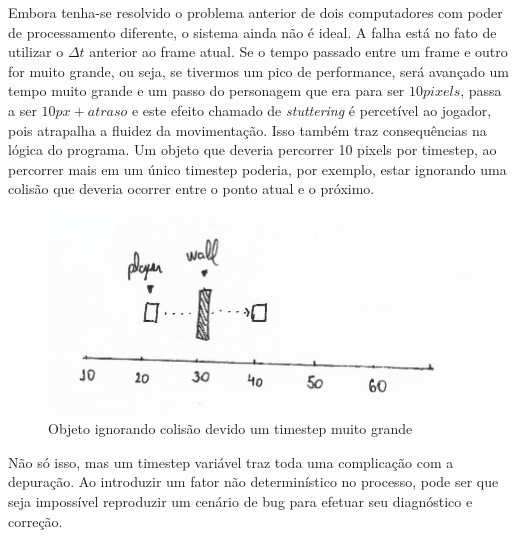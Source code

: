 \documentclass[12pt, 
openright, 
oneside, 
a4paper,    
brazil]{facom-ufu-abntex2}
\begin{document}
Embora tenha-se resolvido o problema anterior de dois computadores com poder de processamento diferente, o sistema ainda não é ideal. A falha está no fato de utilizar o $\Delta t$ anterior ao frame atual. Se o tempo passado entre um frame e outro for muito grande, ou seja, se tivermos um pico de performance, será avançado um tempo muito grande e um passo do personagem que era para ser $10 pixels$, passa a ser $10px + atraso$ e este efeito chamado de \textit{stuttering} é percetível ao jogador, pois atrapalha a fluidez da movimentação. Isso também traz consequências na lógica do programa. Um objeto que deveria percorrer 10 pixels por timestep, ao percorrer mais em um único timestep poderia, por exemplo, estar ignorando uma colisão que deveria ocorrer entre o ponto atual e o próximo.
\begin{figure}[H]
	\centering
	\includegraphics[width=\textwidth]{imagens/ilu4.png}
	\caption{Objeto ignorando colisão devido um timestep muito grande}
\end{figure}
 Não só isso, mas um timestep variável traz toda uma complicação com a depuração. Ao introduzir um fator não determinístico no processo, pode ser que seja impossível reproduzir um cenário de bug para efetuar seu diagnóstico e correção. 
\end{document}
